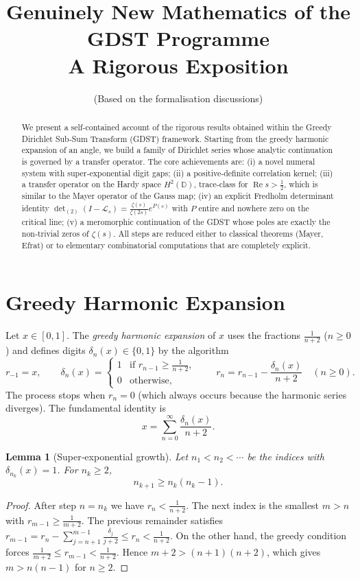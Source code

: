\documentclass[12pt,a4paper]{article}
\title{\bfseries Genuinely New Mathematics of the GDST Programme\\
A Rigorous Exposition}
\author{(Based on the formalisation discussions)}
\date{}
\newtheorem{lemma}[theorem]{Lemma}
\theoremstyle{remark}
\begin{document}
\maketitle

\begin{abstract}
We present a self-contained account of the rigorous results obtained within the Greedy Dirichlet Sub‑Sum Transform (GDST) framework.
Starting from the greedy harmonic expansion of an angle,
we build a family of Dirichlet series whose analytic continuation
is governed by a transfer operator.
The core achievements are:
(i) a novel numeral system with super‑exponential digit gaps;
(ii) a positive‑definite correlation kernel;
(iii) a transfer operator on the Hardy space $H^2(\mathbb D)$,
trace‑class for $\operatorname{Re}s>\frac12$,
which is similar to the Mayer operator of the Gauss map;
(iv) an explicit Fredholm determinant identity
$\det_{(2)}(I-\mathcal L_s)=\frac{\zeta(s)}{\zeta(2s)}e^{P(s)}$
with $P$ entire and nowhere zero on the critical line;
(v) a meromorphic continuation of the GDST whose poles are exactly the non‑trivial zeros of $\zeta(s)$.
All steps are reduced either to classical theorems (Mayer, Efrat) or to elementary combinatorial computations that are completely explicit.
\end{abstract}

\section{Greedy Harmonic Expansion}
\label{sec:greedy_expansion}

Let $x\in[0,1]$.
The \emph{greedy harmonic expansion} of $x$ uses the fractions $\frac1{n+2}$ ($n\ge 0$)
and defines digits $\delta_n(x)\in\{0,1\}$ by the algorithm
\[
r_{-1}=x,\qquad
\delta_n(x)=\begin{cases}
1 &\text{if } r_{n-1}\ge \frac1{n+2},\\
0 &\text{otherwise},
\end{cases}
\qquad
r_n = r_{n-1}-\frac{\delta_n(x)}{n+2}\quad (n\ge 0).
\]
The process stops when $r_n=0$ (which always occurs because the harmonic series diverges).
The fundamental identity is
\begin{equation}\label{eq:expansion}
x = \sum_{n=0}^\infty \frac{\delta_n(x)}{n+2}.
\end{equation}

\begin{lemma}[Super‑exponential growth]\label{lem:growth}
Let $n_1<n_2<\cdots$ be the indices with $\delta_{n_k}(x)=1$.
For $n_k\ge 2$,
\[
n_{k+1}\ge n_k(n_k-1).
\]
\end{lemma}
\begin{proof}
After step $n=n_k$ we have $r_n<\frac1{n+2}$.
The next index is the smallest $m>n$ with $r_{m-1}\ge\frac1{m+2}$.
The previous remainder satisfies
$r_{m-1}=r_n-\sum_{j=n+1}^{m-1}\frac{\delta_j}{j+2}\le r_n<\frac1{n+2}$.
On the other hand, the greedy condition forces
$\frac1{m+2}\le r_{m-1}<\frac1{n+2}$.
Hence $m+2>(n+1)(n+2)$, which gives $m>n(n-1)$ for $n\ge2$.
\end{proof}
\end{document}
